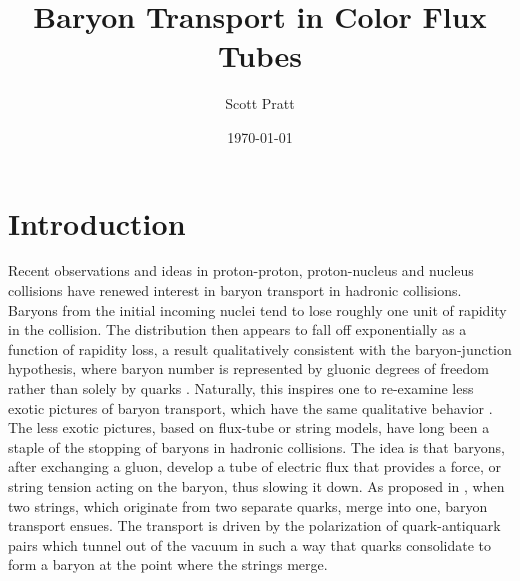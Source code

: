 \documentclass[aps, prc, 12pt, nofootinbib, showpacs, superscriptaddress, tightenlines, groupedaddress]{revtex4-2}
\begin{document}
\title{Baryon Transport in Color Flux Tubes}
\author{Scott Pratt}
\date{\today}

\pacs{}

\begin{abstract}

\end{abstract}

\maketitle

\section{Introduction}

Recent observations and ideas in proton-proton, proton-nucleus and nucleus collisions have renewed interest in baryon transport in hadronic collisions\cite{Brandenburg:2022hrp,STAR:2008med,STAR:2017sal,BRAHMS:2003wwg}. Baryons from the initial incoming nuclei tend to lose roughly one unit of rapidity in the collision. The distribution then appears to fall off exponentially as a function of rapidity loss, a result qualitatively consistent with the baryon-junction hypothesis, where baryon number is represented by gluonic degrees of freedom rather than solely by quarks \cite{Kharzeev:1996sq}. Naturally, this inspires one to re-examine less exotic pictures of baryon transport, which have the same qualitative behavior \cite{Vance:1997th}. The less exotic pictures, based on flux-tube or string models, have long been a staple of the stopping of baryons in hadronic collisions. The idea is that baryons, after exchanging a gluon, develop a tube of electric flux that provides a force, or string tension acting on the baryon, thus slowing it down. As proposed in \cite{Vance:1997th}, when two strings, which originate from two separate quarks, merge into one, baryon transport ensues. The transport is driven by the polarization of quark-antiquark pairs which tunnel out of the vacuum in such a way that quarks consolidate to form a baryon at the point where the strings merge.
\end{document}
